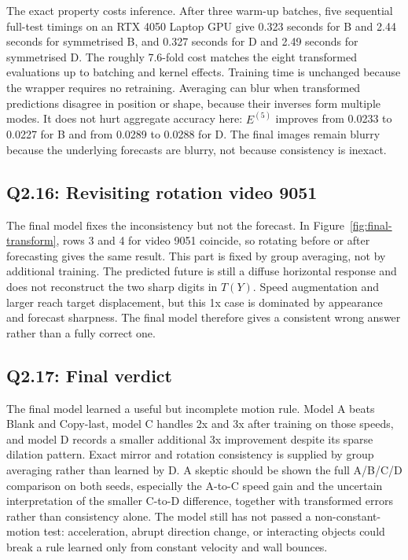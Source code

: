 \documentclass{article}
\newcommand{\Efive}{\ensuremath{E^{(5)}}}
\begin{document}
The exact property costs inference. After three warm-up batches, five sequential full-test timings on an RTX 4050 Laptop GPU give 0.323 seconds for B and 2.44 seconds for symmetrised B, and 0.327 seconds for D and 2.49 seconds for symmetrised D. The roughly 7.6-fold cost matches the eight transformed evaluations up to batching and kernel effects. Training time is unchanged because the wrapper requires no retraining. Averaging can blur when transformed predictions disagree in position or shape, because their inverses form multiple modes. It does not hurt aggregate accuracy here: \Efive{} improves from 0.0233 to 0.0227 for B and from 0.0289 to 0.0288 for D. The final images remain blurry because the underlying forecasts are blurry, not because consistency is inexact.

\subsection*{Q2.16: Revisiting rotation video 9051}

The final model fixes the inconsistency but not the forecast. In Figure~\ref{fig:final-transform}, rows 3 and 4 for video 9051 coincide, so rotating before or after forecasting gives the same result. This part is fixed by group averaging, not by additional training. The predicted future is still a diffuse horizontal response and does not reconstruct the two sharp digits in $T(Y)$. Speed augmentation and larger reach target displacement, but this 1x case is dominated by appearance and forecast sharpness. The final model therefore gives a consistent wrong answer rather than a fully correct one.

\subsection*{Q2.17: Final verdict}

The final model learned a useful but incomplete motion rule. Model A beats Blank and Copy-last, model C handles 2x and 3x after training on those speeds, and model D records a smaller additional 3x improvement despite its sparse dilation pattern. Exact mirror and rotation consistency is supplied by group averaging rather than learned by D. A skeptic should be shown the full A/B/C/D comparison on both seeds, especially the A-to-C speed gain and the uncertain interpretation of the smaller C-to-D difference, together with transformed errors rather than consistency alone. The model still has not passed a non-constant-motion test: acceleration, abrupt direction change, or interacting objects could break a rule learned only from constant velocity and wall bounces.
\end{document}
